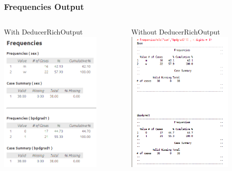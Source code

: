 \documentclass[xcolor={table}]{beamer}
\begin{document}
\begin{frame}\frametitle{Frequencies Output}
\begin{columns}
\begin{column}{0.5\textwidth}
With DeducerRichOutput\\
\includegraphics[height=7cm]{frequ3.png} 
\end{column}
\begin{column}{0.5\textwidth}
Without DeducerRichOutput\\
\includegraphics[height=7cm]{frequ4.png}
\end{column}
\end{columns}
\end{frame}
\end{document}
